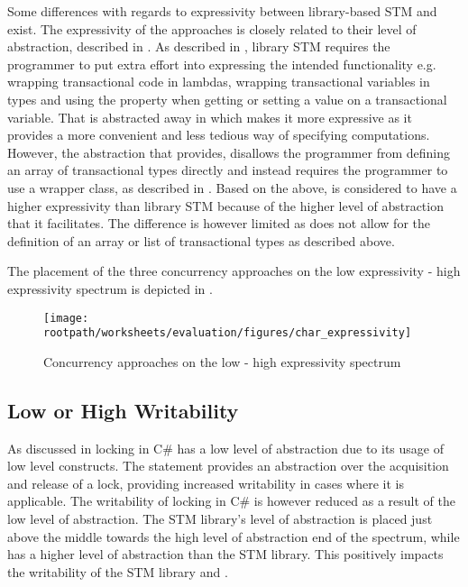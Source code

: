 Some differences with regards to expressivity between library-based \ac{STM} and \stmname exist. The expressivity of the approaches is closely related to their level of abstraction, described in . As described in , library \ac{STM} requires the programmer to put extra effort into expressing the intended functionality e.g. wrapping transactional code in lambdas, wrapping transactional variables in  types and using the  property when getting or setting a value on a transactional variable. That is abstracted away in \stmname which makes it more expressive as it provides a more convenient and less tedious way of specifying computations. However, the abstraction that \stmname provides, disallows the programmer from defining an array of transactional types directly and instead requires the programmer to use a wrapper class, as described in . Based on the above, \stmname is considered to have a higher expressivity than library \ac{STM} because of the higher level of abstraction that it facilitates. The difference is however limited as \stmname does not allow for the definition of an array or list of transactional types as described above.

The placement of the three concurrency approaches on the low expressivity - high expressivity spectrum is depicted in .

\begin{figure}[htbp]
\centering
\texttt{[image: \\rootpath/worksheets/evaluation/figures/char\_expressivity]}
\caption{Concurrency approaches on the low - high expressivity spectrum}
\label{fig:char_expressivity}
\end{figure}

\subsection{Low or High Writability}
As discussed in  locking in C\# has a low level of abstraction due to its usage of low level constructs. The  statement provides an abstraction over the acquisition and release of a lock, providing increased writability in cases where it is applicable. The writability of locking in C\# is however reduced as a result of the low level of abstraction. The \ac{STM} library's level of abstraction is placed just above the middle towards the high level of abstraction end of the spectrum, while \stmname has a higher level of abstraction than the \ac{STM} library. This positively impacts the writability of the \ac{STM} library and \stmname.

